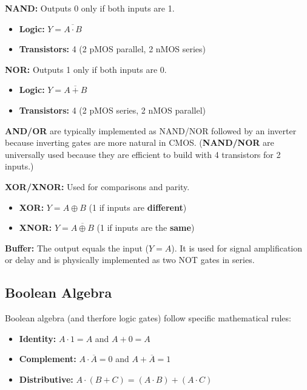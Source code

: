 \begin{definition}
	\textbf{NAND:} Outputs 0 only if both inputs are 1.
	\begin{itemize}
		\item \textbf{Logic:} $Y = \overline{A \cdot B}$
		\item \textbf{Transistors:} 4 (2 pMOS parallel, 2 nMOS series)
	\end{itemize}
\end{definition}

\begin{definition}
	\textbf{NOR:} Outputs 1 only if both inputs are 0.
	\begin{itemize}
		\item \textbf{Logic:} $Y = \overline{A + B}$
		\item \textbf{Transistors:} 4 (2 pMOS series, 2 nMOS parallel)
	\end{itemize}
\end{definition}

\begin{remark}
	\textbf{AND/OR} are typically implemented as NAND/NOR followed by an inverter because inverting gates are more natural in CMOS. (\textbf{NAND/NOR} are universally used because they are efficient to build with 4 transistors for 2 inputs.)
\end{remark}

\begin{remark}
	\textbf{XOR/XNOR:} Used for comparisons and parity.
	\begin{itemize}
		\item \textbf{XOR:} $Y = A \oplus B$ (1 if inputs are \textbf{different})
		\item \textbf{XNOR:} $Y = \overline{A \oplus B}$ (1 if inputs are the \textbf{same})
	\end{itemize}
\end{remark}

\begin{definition}
	\textbf{Buffer:} The output equals the input ($Y = A$). It is used for signal amplification or delay and is physically implemented as two NOT gates in series.
\end{definition}

\subsection{Boolean Algebra}

\begin{definition}
	Boolean algebra (and therfore logic gates) follow specific mathematical rules:
	\begin{itemize}
		\item \textbf{Identity:} $A \cdot 1 = A$ and $A + 0 = A$
		\item \textbf{Complement:} $A \cdot \overline{A} = 0$ and $A + \overline{A} = 1$
		\item \textbf{Distributive:} $A \cdot (B + C) = (A \cdot B) + (A \cdot C)$
	\end{itemize}
\end{definition}

